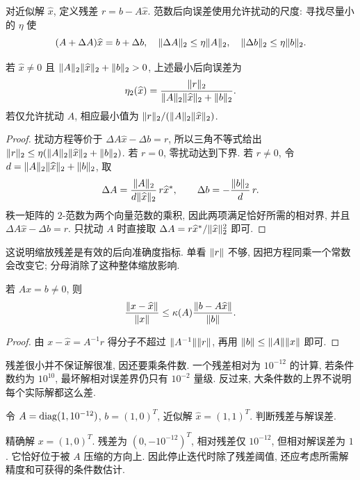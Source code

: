 \begin{definition}
对近似解 $\widehat x$, 定义残差 $r=b-A\widehat x$. 范数后向误差使用允许扰动的尺度: 寻找尽量小的 $\eta$ 使
\[
(A+\Delta A)\widehat x=b+\Delta b,\quad
\lVert \Delta A\rVert_2\le\eta\lVert A\rVert_2,\quad
\lVert \Delta b\rVert_2\le\eta\lVert b\rVert_2.
\]
\end{definition}
\begin{theorem}\label{thm:backward}
若 $\widehat x\ne0$ 且 $\lVert A\rVert_2\lVert \widehat x\rVert_2+\lVert b\rVert_2>0$, 上述最小后向误差为
\[
\eta_2(\widehat x)=\frac{\lVert r\rVert_2}{\lVert A\rVert_2\lVert \widehat x\rVert_2+\lVert b\rVert_2}.
\]
若仅允许扰动 $A$, 相应最小值为 $\lVert r\rVert_2/(\lVert A\rVert_2\lVert \widehat x\rVert_2)$.
\end{theorem}
\begin{proof}
扰动方程等价于 $\Delta A\widehat x-\Delta b=r$, 所以三角不等式给出
$\lVert r\rVert_2\le\eta(\lVert A\rVert_2\lVert \widehat x\rVert_2+\lVert b\rVert_2)$.
若 $r=0$, 零扰动达到下界. 若 $r\ne0$, 令 $d=\lVert A\rVert_2\lVert \widehat x\rVert_2+\lVert b\rVert_2$, 取
\[
\Delta A=\frac{\lVert A\rVert_2}{d\lVert \widehat x\rVert_2}\,r\widehat x^*,
\qquad \Delta b=-\frac{\lVert b\rVert_2}{d}\,r.
\]
秩一矩阵的 $2$-范数为两个向量范数的乘积, 因此两项满足恰好所需的相对界, 并且 $\Delta A\widehat x-\Delta b=r$. 只扰动 $A$ 时直接取 $\Delta A=r\widehat x^*/\lVert \widehat x\rVert_2^2$ 即可.
\end{proof}
这说明缩放残差是有效的后向准确度指标. 单看 $\lVert r\rVert$ 不够, 因把方程同乘一个常数会改变它; 分母消除了这种整体缩放影响.

\begin{corollary}\label{cor:resforward}
若 $Ax=b\ne0$, 则
\[
\frac{\lVert x-\widehat x\rVert}{\lVert x\rVert}
\le\kappa(A)\frac{\lVert b-A\widehat x\rVert}{\lVert b\rVert}.
\]
\end{corollary}
\begin{proof}
由 $x-\widehat x=A^{-1}r$ 得分子不超过 $\lVert A^{-1}\rVert\lVert r\rVert$, 再用 $\lVert b\rVert\le\lVert A\rVert\lVert x\rVert$ 即可.
\end{proof}
残差很小并不保证解很准, 因还要乘条件数. 一个残差相对为 $10^{-12}$ 的计算, 若条件数约为 $10^{10}$, 最坏解相对误差界仍只有 $10^{-2}$ 量级. 反过来, 大条件数的上界不说明每个实际解都这么差.

\begin{example}
令 $A=\operatorname{diag}(1,10^{-12})$, $b=(1,0)^T$, 近似解 $\widehat x=(1,1)^T$. 判断残差与解误差.
\end{example}
\begin{solution}
精确解 $x=(1,0)^T$. 残差为 $(0,-10^{-12})^T$, 相对残差仅 $10^{-12}$, 但相对解误差为 $1$. 它恰好位于被 $A$ 压缩的方向上. 因此停止迭代时除了残差阈值, 还应考虑所需解精度和可获得的条件数估计.
\end{solution}


